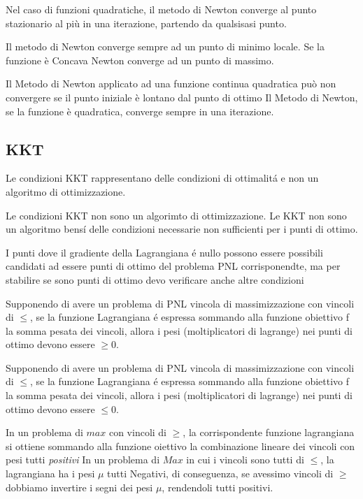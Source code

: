 \documentclass[12pt, a4paper, openany]{book}
\begin{document}
\affermazionetrue
{Nel caso di funzioni quadratiche, il metodo di Newton converge al punto stazionario al più in una iterazione, partendo da qualsisasi punto.}

\affermazionefalse
{Il metodo di Newton converge sempre ad un punto di minimo locale.}
{Se la funzione è Concava Newton converge ad un punto di massimo.}

\affermazionefalse
{Il Metodo di Newton applicato ad una funzione continua quadratica può non convergere se il punto iniziale è lontano dal punto di ottimo}
{Il Metodo di Newton, se la funzione è quadratica, converge sempre in una iterazione.}

\subsection{KKT}
\affermazionetrue
{Le condizioni KKT rappresentano delle condizioni di ottimalitá e non un algoritmo di ottimizzazione.}

\affermazionetrue
{Le condizioni KKT non sono un algorimto di ottimizzazione.}
{Le KKT non sono un algoritmo bensí delle condizioni necessarie non sufficienti per i punti di ottimo.}

\affermazionetrue
{I punti dove il gradiente della Lagrangiana é nullo possono essere possibili candidati ad essere punti di ottimo del problema PNL corrisponendte,
ma per stabilire se sono punti di ottimo devo verificare anche altre condizioni}
{}

\affermazionetrue
{Supponendo di avere un problema di PNL vincola di massimizzazione con vincoli di $\leq$, se la funzione Lagrangiana é espressa sommando alla funzione obiettivo f la somma pesata dei vincoli, allora i pesi (moltiplicatori di lagrange) nei punti di ottimo devono essere $\geq 0$.}

\affermazionefalse
{Supponendo di avere un problema di PNL vincola di massimizzazione con vincoli di $\leq$, se la funzione Lagrangiana é espressa sommando alla funzione obiettivo f la somma pesata dei vincoli, allora i pesi (moltiplicatori di lagrange) nei punti di ottimo devono essere $\leq 0$.}

\affermazionetrue
{In un problema di $max$ con vincoli di $\geq$, la corrispondente funzione lagrangiana si ottiene sommando alla funzione oiettivo la combinazione lineare dei vincoli con pesi tutti \emph{positivi}}
{In un problema di $Max$ in cui i vincoli sono tutti di $\leq$, la lagrangiana ha i pesi $\mu$ tutti Negativi, di conseguenza, se avessimo vincoli di $\geq$ dobbiamo invertire i segni dei pesi $\mu$, rendendoli tutti positivi.}
\end{document}
